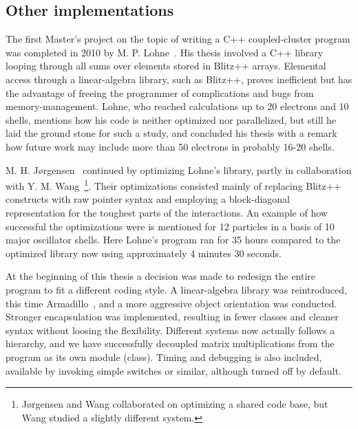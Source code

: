 \subsection{Other implementations}
The first Master's project on the topic of writing a C++ coupled-cluster program was completed in 2010 by M. P. Lohne~\cite{mplohne}.
His thesis involved a C++ library looping through all sums over elements stored in Blitz++ arrays.
Elemental access through a linear-algebra library, such as Blitz++, proves inefficient but has the advantage of freeing the programmer of complications and bugs from memory-management.
Lohne, who reached calculations up to 20 electrons and 10 shells, mentions how his code is neither optimized nor parallelized, but still he laid the ground stone for such a study, and concluded his thesis with a remark how future work may include more than 50 electrons in probably 16-20 shells.

M. H. Jørgensen~\cite{marte} continued by optimizing Lohne's library, partly in collaboration with Y. M. Wang~\cite{ymwang}\footnote{Jørgensen and Wang collaborated on optimizing a shared code base, but Wang studied a slightly different system.}.
Their optimizations consisted mainly of replacing Blitz++ constructs with raw pointer syntax and employing a block-diagonal representation for the toughest parts of the interactions.
An example of how successful the optimizations were is mentioned for 12 particles in a basis of 10 major oscillator shells.
Here Lohne's program ran for 35 hours compared to the optimized library now using approximately 4 minutes 30 seconds.

At the beginning of this thesis a decision was made to redesign the entire program to fit a different coding style.
A linear-algebra library was reintroduced, this time Armadillo~\cite{armadillo}, and a more aggressive object orientation was conducted.
Stronger encapsulation was implemented, resulting in fewer classes and cleaner syntax without loosing the flexibility.
Different systems now actually follows a hierarchy, and we have successfully decoupled matrix multiplications from the program as its own module (class).
Timing and debugging is also included, available by invoking simple switches or similar, although turned off by default.

